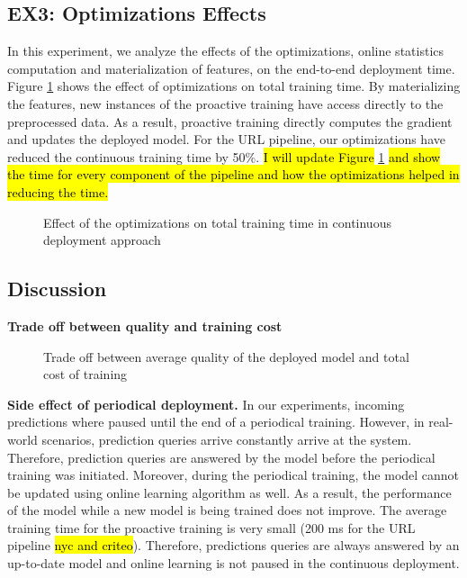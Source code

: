 \subsection{EX3: Optimizations Effects}
In this experiment, we analyze the effects of the optimizations, online statistics computation and materialization of features, on the end-to-end deployment time.
Figure \ref{optimization-effect} shows the effect of optimizations on total training time.
By materializing the features, new instances of the proactive training have access directly to the preprocessed data.
As a result, proactive training directly computes the gradient and updates the deployed model.
For the URL pipeline, our optimizations have reduced the continuous training time by 50\%.
\hl{I will update Figure} \ref{optimization-effect} \hl{and show the time for every component of the pipeline and how the optimizations helped in reducing the time.}
\begin{figure}[h!]
\centering
\resizebox{\columnwidth}{!}{}
\caption{Effect of the optimizations on total training time in continuous deployment approach}
\label{optimization-effect}
\end{figure}

\subsection{Discussion} \label{subsec:discussion}
\textbf{Trade off between quality and training cost}

\begin{figure}[!h]
\centering
\resizebox{\columnwidth}{!}{}
\caption{Trade off between average quality of the deployed model and total cost of training}
\label{sampling-method-figure}
\end{figure}

\textbf{Side effect of periodical deployment.}
In our experiments, incoming predictions where paused until the end of a periodical training.
However, in real-world scenarios, prediction queries arrive constantly arrive at the system.
Therefore, prediction queries are answered by the model before the periodical training was initiated. 
Moreover, during the periodical training, the model cannot be updated using online learning algorithm as well.
As a result, the performance of the model while a new model is being trained does not improve.
The average training time for the proactive training is very small (200 ms for the URL pipeline \hl{nyc and criteo}).
Therefore, predictions queries are always answered by an up-to-date model and online learning is not paused in the continuous deployment.


